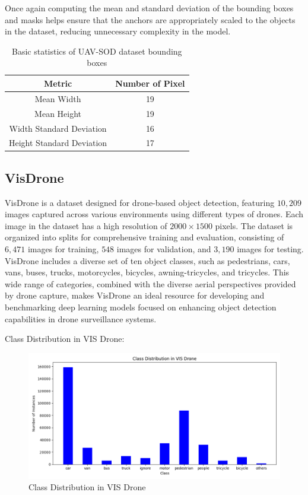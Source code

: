 Once again computing the mean and standard deviation of the bounding boxes and masks helps ensure that the anchors are appropriately scaled to the objects in the dataset, 
reducing unnecessary complexity in the model.
\begin{table}[h]
    \centering
    \begin{tabular}{|c|c|}
        \hline
        Metric                     & Number of Pixel   \\ \hline
        Mean Width                 & 19                \\ \hline
        Mean Height                & 19                \\ \hline
        Width Standard Deviation   & 16                \\ \hline
        Height Standard Deviation  & 17                \\ \hline
    \end{tabular}
    \caption{Basic statistics of UAV-SOD dataset bounding boxes}
    \label{tab:uav_bboxes}
\end{table}

\newpage
\subsection{VisDrone}

VisDrone \cite{VisDroneDataset} is a dataset designed for drone-based object detection, featuring $10,209$ images captured across various environments using different 
types of drones. Each image in the dataset has a high resolution of $2000 \times 1500$ pixels. The dataset is organized into splits for comprehensive 
training and evaluation, consisting of $6,471$ images for training, $548$ images for validation, and $3,190$ images for testing. VisDrone includes a 
diverse set of ten object classes, such as pedestrians, cars, vans, buses, trucks, motorcycles, bicycles, awning-tricycles, and tricycles. This wide 
range of categories, combined with the diverse aerial perspectives provided by drone capture, makes VisDrone an ideal resource for developing and 
benchmarking deep learning models focused on enhancing object detection capabilities in drone surveillance systems.

Class Distribution in VIS Drone:

\begin{figure}[h!]
    \centering
    \includegraphics[scale=0.55]{Figures/vis_drone_data_class_distribution.png}
    \caption{Class Distribution in VIS Drone }
    \label{fig:vis-class}
\end{figure}


